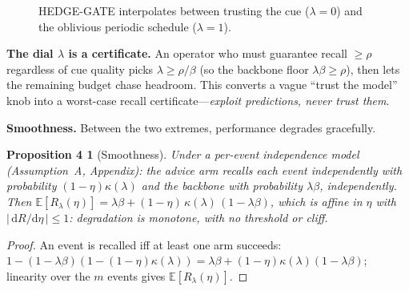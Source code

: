 ﻿\documentclass[lettersize,journal]{IEEEtran}
\newtheorem*{propfour}{Proposition 4}
\begin{document}
\begin{figure}[!tb]
\centering
{}
\caption{HEDGE-GATE interpolates between trusting the cue ($\lambda{=}0$) and the oblivious periodic schedule ($\lambda{=}1$).}
\label{alg:hedge}
\end{figure}

\textbf{The dial $\lambda$ is a certificate.} An operator who must guarantee recall $\ge\rho$ regardless of cue quality picks $\lambda\ge\rho/\beta$ (so the backbone floor $\lambda\beta\ge\rho$), then lets the remaining budget chase headroom. This converts a vague ``trust the model'' knob into a worst-case recall certificate---\emph{exploit predictions, never trust them}.

\textbf{Smoothness.} Between the two extremes, performance degrades gracefully.
\begin{propfour}[Smoothness]
Under a per-event independence model (Assumption~A, Appendix): the advice arm recalls each event independently with probability $(1{-}\eta)\kappa(\lambda)$ and the backbone with probability $\lambda\beta$, independently. Then $\mathbb E[R_\lambda(\eta)]=\lambda\beta+(1{-}\eta)\,\kappa(\lambda)\,(1{-}\lambda\beta)$, which is \emph{affine} in $\eta$ with $|\,\mathrm dR/\mathrm d\eta\,|\le1$: degradation is monotone, with no threshold or cliff.
\end{propfour}
\begin{proof}
An event is recalled iff at least one arm succeeds: $1-(1{-}\lambda\beta)(1-(1{-}\eta)\kappa(\lambda))=\lambda\beta+(1{-}\eta)\kappa(\lambda)(1{-}\lambda\beta)$; linearity over the $m$ events gives $\mathbb E[R_\lambda(\eta)]$.
\end{proof}
\end{document}

